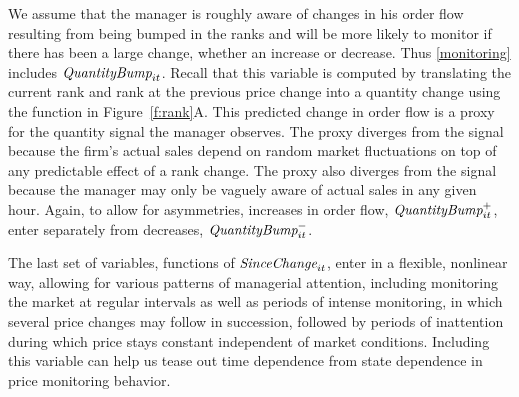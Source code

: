 \documentclass[11pt]{article}
\newcommand{\SinceChange}{\mbox{\it SinceChange}}
\newcommand{\QuantityBump}{\mbox{\it QuantityBump}}
\begin{document}
\begin{spacing}{1.3}
We assume that the manager is roughly aware of changes in his order
flow resulting from being bumped in the ranks and will be more likely
to monitor if there has been a large change, whether an increase or
decrease. Thus \eqref{monitoring} includes
$\QuantityBump_{it}$. Recall that this variable is computed by
translating the current rank and rank at the previous price change
into a quantity change using the function in
Figure~\ref{f:rank}A. This predicted change in order flow is a proxy
for the quantity signal the manager observes. The proxy diverges from
the signal because the firm's actual sales depend on random market
fluctuations on top of any predictable effect of a rank change. The
proxy also diverges from the signal because the manager may only be
vaguely aware of actual sales in any given hour. Again, to allow for
asymmetries, increases in order flow, $\QuantityBump_{it}^+$, enter
separately from decreases, $\QuantityBump_{it}^-$.

The last set of variables, functions of $\SinceChange_{it}$, enter in
a flexible, nonlinear way, allowing for various patterns of managerial
attention, including monitoring the market at regular intervals as
well as periods of intense monitoring, in which several price changes
may follow in succession, followed by periods of inattention during
which price stays constant independent of market conditions.
Including this variable can help us tease out time dependence from
state dependence in price monitoring behavior.


\end{spacing}
\end{document}
